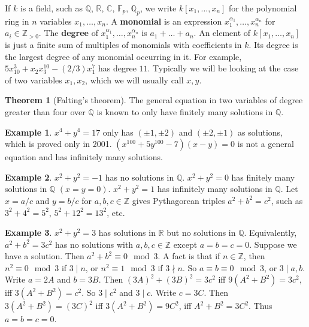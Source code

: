 \documentclass{article}
\newcommand{\F}{\mathbb{F}}
\newcommand{\Z}{\mathbb{Z}}
\newcommand{\Q}{\mathbb{Q}}
\newcommand{\R}{\mathbb{R}}
\newcommand{\C}{\mathbb{C}}
\newcommand{\rb}[1]{\left( #1 \right)}
\renewcommand{\sb}[1]{\left[ #1 \right]}
\theoremstyle{definition}\newtheorem{definition}{Definition}[section]
\theoremstyle{definition}\newtheorem{remark}[definition]{Remark}
\theoremstyle{definition}\newtheorem*{example}{Example}
\theoremstyle{definition}\newtheorem*{note}{Note}
\newtheorem{theorem}[definition]{Theorem}
\begin{document}
If $ k $ is a field, such as $ \Q $, $ \R $, $ \C $, $ \F_p $, $ \Q_p $, we write $ k\sb{x_1, \dots, x_n} $ for the polynomial ring in $ n $ variables $ x_1, \dots, x_n $. A \textbf{monomial} is an expression $ x_1^{\alpha_1}, \dots, x_n^{\alpha_n} $ for $ a_i \in \Z_{> 0} $. The \textbf{degree} of $ x_1^{\alpha_1}, \dots, x_n^{\alpha_n} $ is $ a_1 + \dots + a_n $. An element of $ k\sb{x_1, \dots, x_n} $ is just a finite sum of multiples of monomials with coefficients in $ k $. Its degree is the largest degree of any monomial occurring in it. For example, $ 5x_{10}^3 + x_2x_3^{10} - \rb{2 / 3}x_1^7 $ has degree $ 11 $. Typically we will be looking at the case of two variables $ x_1, x_2 $, which we will usually call $ x, y $.

\begin{theorem}[Falting's theorem]
The general equation in two variables of degree greater than four over $ \Q $ is known to only have finitely many solutions in $ \Q $.
\end{theorem}

\begin{example}
$ x^4 + y^4 = 17 $ only has $ \rb{\pm 1, \pm 2} $ and $ \rb{\pm 2, \pm 1} $ as solutions, which is proved only in 2001. $ \rb{x^{100} + 5y^{100} - 7}\rb{x - y} = 0 $ is not a general equation and has infinitely many solutions.
\end{example}

\begin{example}
$ x^2 + y^2 = -1 $ has no solutions in $ \Q $. $ x^2 + y^2 = 0 $ has finitely many solutions in $ \Q $ $ \rb{x = y = 0} $. $ x^2 + y^2 = 1 $ has infinitely many solutions in $ \Q $. Let $ x = a / c $ and $ y = b / c $ for $ a, b, c \in \Z $ gives Pythagorean triples $ a^2 + b^2 = c^2 $, such as $ 3^2 + 4^2 = 5^2 $, $ 5^2 + 12^2 = 13^2 $, etc.
\end{example}

\begin{example}
$ x^2 + y^2 = 3 $ has solutions in $ \R $ but no solutions in $ \Q $. Equivalently, $ a^2 + b^2 = 3c^2 $ has no solutions with $ a, b, c \in \Z $ except $ a = b = c = 0 $. Suppose we have a solution. Then $ a^2 + b^2 \equiv 0 \mod 3 $. A fact is that if $ n \in \Z $, then $ n^2 \equiv 0 \mod 3 $ if $ 3 \mid n $, or $ n^2 \equiv 1 \mod 3 $ if $ 3 \nmid n $. So $ a \equiv b \equiv 0 \mod 3 $, or $ 3 \mid a, b $. Write $ a = 2A $ and $ b = 3B $. Then $ \rb{3A}^2 + \rb{3B}^2 = 3c^2 $ iff $ 9\rb{A^2 + B^2} = 3c^2 $, iff $ 3\rb{A^2 + B^2} = c^2 $. So $ 3 \mid c^2 $ and $ 3 \mid c $. Write $ c = 3C $. Then $ 3\rb{A^2 + B^2} = \rb{3C}^2 $ iff $ 3\rb{A^2 + B^2} = 9C^2 $, iff $ A^2 + B^2 = 3C^2 $. Thus $ a = b = c = 0 $.
\end{example}
\end{document}
